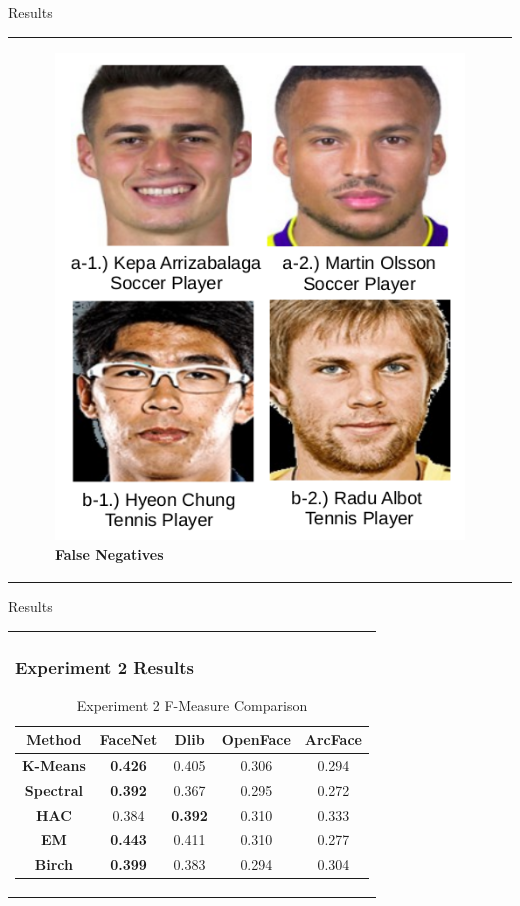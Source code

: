 \documentclass[11pt]{beamer}
\begin{document}
\begin{frame}{Results}
\begin{tabular}{l}
{\begin{figure}[H]
\begin{minipage}[b]{0.4\textwidth}
    \includegraphics[width=\textwidth]{figures/soccer_fn.png}
    \caption{\textbf{False Negatives}}
    \label{fig:ex1fn}
  \end{minipage}
\end{figure}

}
\end{tabular}  
\end{frame}

\begin{frame}{Results}
\begin{tabular}{l}
\parbox{1\linewidth}{
\frametitle{Experiment 2 Results}
\begin{table}[H]
\centering
\begin{tabular}{||c c c c c||} 
 \hline
Method & FaceNet & Dlib & OpenFace & ArcFace\\ [0.5ex]
 \hline\hline
 \textbf{K-Means} & \textbf{0.426} & 0.405 & 0.306 & 0.294\\ 
 \hline
  \textbf{Spectral} & \textbf{0.392} & 0.367 & 0.295 & 0.272\\
 \hline
 \textbf{HAC} & 0.384 & \textbf{0.392} & 0.310 & 0.333\\
 \hline
 \textbf{EM} & \textbf{0.443} & 0.411 & 0.310 & 0.277\\
 \hline
 \textbf{Birch} & \textbf{0.399} & 0.383 & 0.294 & 0.304\\
 \hline
\end{tabular}
\caption{Experiment 2 F-Measure Comparison}
\label{table:ex2}
\end{table}

}
\end{tabular}  
\end{frame}
\end{document}
